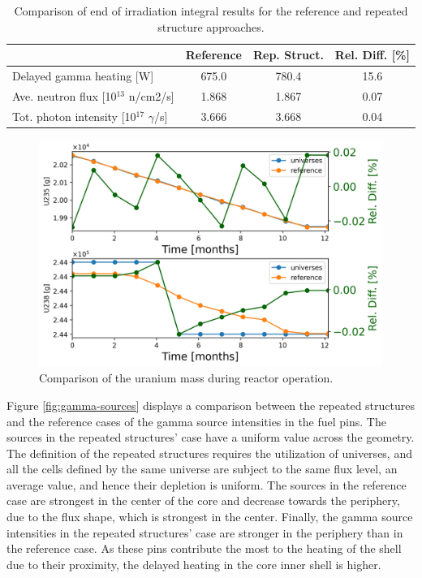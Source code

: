 \begin{table}[!htb]
  \centering
  \caption{Comparison of end of irradiation integral results for the reference and repeated structure approaches.}
  \label{table:verif}
  \begin{tabular}{l|cc|c}
  \toprule
                                           & Reference  & Rep. Struct. & Rel. Diff. [\%] \\ %
  \midrule
   Delayed gamma heating [W]               & 675.0      & 780.4        & 15.6 \\
   Ave. neutron flux [10$^{13}$ n/cm2/s]   & 1.868      & 1.867        & 0.07 \\
   Tot. photon intensity [10$^{17}$ $\gamma$/s] &  3.666  &  3.668     & 0.04 \\
  \bottomrule
  \end{tabular}
\end{table}

\begin{figure}[htbp!] %
    \centering
    \includegraphics[width=0.65\linewidth]{figures/moaa-ref-uni-composition-time-b}
    \hfill
    \caption{Comparison of the uranium mass during reactor operation.}
    \label{fig:ver-comp}
\end{figure}

Figure \ref{fig:gamma-sources} displays a comparison between the repeated structures and the reference cases of the gamma source intensities in the fuel pins.
The sources in the repeated structures' case have a uniform value across the geometry.
The definition of the repeated structures requires the utilization of universes, and all the cells defined by the same universe are subject to the same flux level, an average value, and hence their depletion is uniform.
The sources in the reference case are strongest in the center of the core and decrease towards the periphery, due to the flux shape, which is strongest in the center.
Finally, the gamma source intensities in the repeated structures' case are stronger in the periphery than in the reference case.
As these pins contribute the most to the heating of the shell due to their proximity, the delayed heating in the core inner shell is higher.

